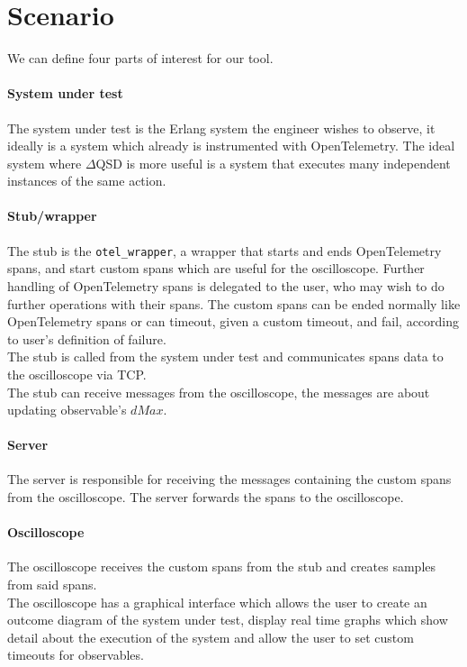 \section{Scenario}
    We can define four parts of interest for our tool.
    \paragraph{System under test} The system under test is the Erlang system the engineer wishes to observe, it ideally is a system which already is instrumented with OpenTelemetry. The ideal system where $\Delta$QSD is more useful is a system that executes many independent instances of the same action.
    
    \paragraph{Stub/wrapper} The stub is the \texttt{otel\_wrapper}, a wrapper that starts and ends OpenTelemetry spans, and start custom spans which are useful for the oscilloscope. Further handling of OpenTelemetry spans is delegated to the user, who may wish to do further operations with their spans. 
    The custom spans can be ended normally like OpenTelemetry spans or can timeout, given a custom timeout, and fail, according to user's definition of failure. \\
    The stub is called from the system under test and communicates spans data to the oscilloscope via TCP. \\
    The stub can receive messages from the oscilloscope, the messages are about updating observable's $dMax$.
    
    \paragraph{Server} The server is responsible for receiving the messages containing the custom spans from the oscilloscope. The server forwards the spans to the oscilloscope.
    
    \paragraph{Oscilloscope} The oscilloscope receives the custom spans from the stub and creates samples from said spans. \\
    The oscilloscope has a graphical interface which allows the user to create an outcome diagram of the system under test, display real time graphs which show detail about the execution of the system and allow the user to set custom timeouts for observables.

